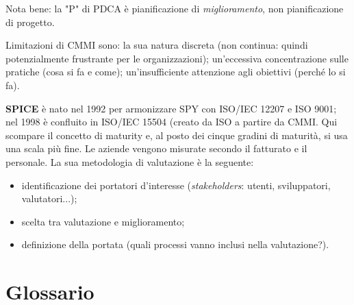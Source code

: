 \documentclass[a4paper]{article}
\begin{document}
		
Nota bene: la "P" di PDCA è pianificazione di \emph{miglioramento}, non pianificazione di progetto.
		
Limitazioni di CMMI sono: la sua natura discreta (non continua: quindi potenzialmente frustrante per le organizzazioni); un'eccessiva concentrazione sulle pratiche (cosa si fa e come); un'insufficiente attenzione agli obiettivi (perché lo si fa).
		
\textbf{SPICE} è nato nel 1992 per armonizzare SPY con ISO/IEC 12207 e ISO 9001; nel 1998 è confluito in ISO/IEC 15504 (creato da ISO a partire da CMMI. Qui scompare il concetto di maturity e, al posto dei cinque gradini di maturità, si usa una scala più fine. Le aziende vengono misurate secondo il fatturato e il personale. La sua metodologia di valutazione è la seguente:
		
	\begin{itemize}
		
			
	\item identificazione dei portatori d'interesse (\emph{stakeholders}: utenti, sviluppatori, valutatori...);
			
	\item scelta tra valutazione e miglioramento;%

			
	\item definizione della portata (quali processi vanno inclusi nella valutazione?).
		
	\end{itemize}

	


		
	\newpage
	\appendix
	\section{Glossario}
\end{document}
